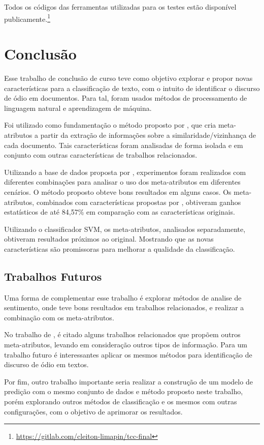 Todos os códigos das ferramentas utilizadas para os testes estão disponível publicamente.\footnote{\url{https://gitlab.com/cleiton-limapin/tcc-final}}

\chapter{Conclusão}\label{cap:conclusao}

Esse trabalho de conclusão de curso teve como objetivo explorar e propor novas características para a classificação de texto, com o intuito de identificar o discurso de ódio em documentos. Para tal, foram usados métodos de processamento de linguagem natural e aprendizagem de máquina.   

Foi utilizado como fundamentação o método proposto por \cite{canutoestudo}, que cria meta-atributos a partir da extração de   informações sobre a  similaridade/vizinhança de cada documento. Tais características foram analisadas de forma isolada e em conjunto com outras características de trabalhos relacionados.

Utilizando a base de dados proposta por \cite{Pelle2017}, experimentos foram realizados com diferentes combinações para analisar o uso dos meta-atributos em diferentes cenários. O método proposto obteve bons resultados em alguns casos. Os meta-atributos, combinados com características propostas por \cite{Pelle2017}, obtiveram ganhos estatísticos de até 84,57\% em comparação com as características originais.

Utilizando o classificador SVM, os meta-atributos, analisados separadamente, obtiveram resultados próximos ao original. Mostrando que as novas características são promissoras para melhorar a qualidade da classificação.

\section{Trabalhos Futuros}
Uma forma de complementar esse trabalho é explorar métodos de analise de sentimento, onde teve bons resultados em trabalhos relacionados, e realizar a combinação com os meta-atributos.

No trabalho de \cite{canutoestudo}, é citado alguns trabalhos relacionados que propõem outros meta-atributos, levando em consideração outros tipos de informação. Para um trabalho futuro é interessantes aplicar os mesmos métodos para identificação de discurso de ódio em textos.

Por fim, outro trabalho importante seria realizar a construção de um modelo de predição com o mesmo conjunto de dados e método proposto neste trabalho, porém explorando outros métodos de classificação e os mesmos com outras configurações, com o objetivo de aprimorar os resultados.
